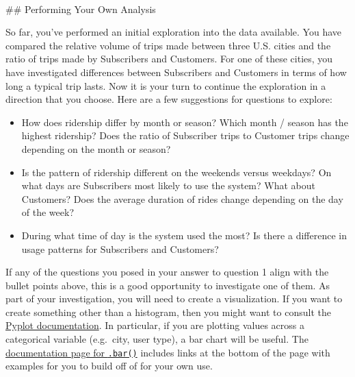\documentclass[11pt]{article}
\providecommand{\tightlist}{%
      \setlength{\itemsep}{0pt}\setlength{\parskip}{0pt}}
\begin{document}
    \begin{center}
    \end{center}
    { \hspace*{\fill} \\}
    
     \#\# Performing Your Own Analysis

So far, you've performed an initial exploration into the data available.
You have compared the relative volume of trips made between three U.S.
cities and the ratio of trips made by Subscribers and Customers. For one
of these cities, you have investigated differences between Subscribers
and Customers in terms of how long a typical trip lasts. Now it is your
turn to continue the exploration in a direction that you choose. Here
are a few suggestions for questions to explore:

\begin{itemize}
\tightlist
\item
  How does ridership differ by month or season? Which month / season has
  the highest ridership? Does the ratio of Subscriber trips to Customer
  trips change depending on the month or season?
\item
  Is the pattern of ridership different on the weekends versus weekdays?
  On what days are Subscribers most likely to use the system? What about
  Customers? Does the average duration of rides change depending on the
  day of the week?
\item
  During what time of day is the system used the most? Is there a
  difference in usage patterns for Subscribers and Customers?
\end{itemize}

If any of the questions you posed in your answer to question 1 align
with the bullet points above, this is a good opportunity to investigate
one of them. As part of your investigation, you will need to create a
visualization. If you want to create something other than a histogram,
then you might want to consult the
\href{https://matplotlib.org/devdocs/api/pyplot_summary.html}{Pyplot
documentation}. In particular, if you are plotting values across a
categorical variable (e.g.~city, user type), a bar chart will be useful.
The
\href{https://matplotlib.org/devdocs/api/_as_gen/matplotlib.pyplot.bar.html\#matplotlib.pyplot.bar}{documentation
page for \texttt{.bar()}} includes links at the bottom of the page with
examples for you to build off of for your own use.
\end{document}
